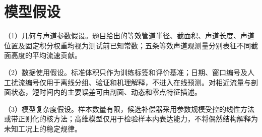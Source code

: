\section{模型假设}

（1）几何与声道参数假设。题目给出的等效管道半径、截面积、声道长度、声道位置及固定积分权重均视为测试前已知常数；五条等效声道观测量分别表征不同截面高度的平均流速贡献。

（2）数据使用假设。标准体积只作为训练标签和评价基准；日期、窗口编号及人工扰流编号仅用于离线分组、验证和机理解释，不进入在线预测。对相近流量与剖面状态，短时间内的主要误差可由剖面、动态和零点特征描述。

（3）模型复杂度假设。样本数量有限，候选补偿器采用参数规模受控的线性方法或带正则化的核方法；高维模型仅用于检验样本内表达能力，不将偶然结构解释为未知工况上的稳定规律。
